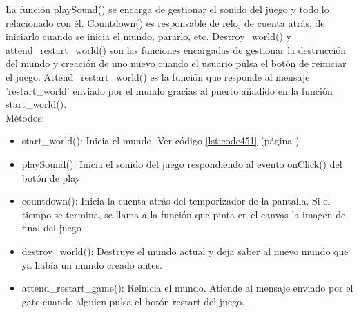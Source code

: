 La función playSound() se encarga de gestionar el sonido del juego y todo lo relacionado con él. Countdown() es responsable de reloj de 
cuenta atrás, de iniciarlo cuando se inicia el mundo, pararlo, etc. Destroy\_world() y attend\_restart\_world() son las funciones encargadas 
de gestionar la destrucción del mundo y creación de uno nuevo cuando el usuario pulsa el botón de reiniciar el juego. 
Attend\_restart\_world() es la función que responde al mensaje 'restart\_world' enviado por el mundo gracias al puerto añadido en la 
función start\_world().\\

Métodos:
\begin{itemize}
 \item start\_world():
Inicia el mundo. Ver código \ref{lst:code451} (página \pageref{lst:code451})

 \item playSound():
Inicia el sonido del juego respondiendo al evento onClick() del botón de play

 \item countdown():
Inicia la cuenta atrás del temporizador de la pantalla. Si el tiempo se termina, se llama a la función que pinta en el canvas la imagen de final del juego

 \item destroy\_world():
Destruye el mundo actual y deja saber al nuevo mundo que ya había un mundo creado antes.

 \item attend\_restart\_game():
Reinicia el mundo. Atiende al mensaje enviado por el gate cuando alguien pulsa el botón restart del juego.
\end{itemize}
